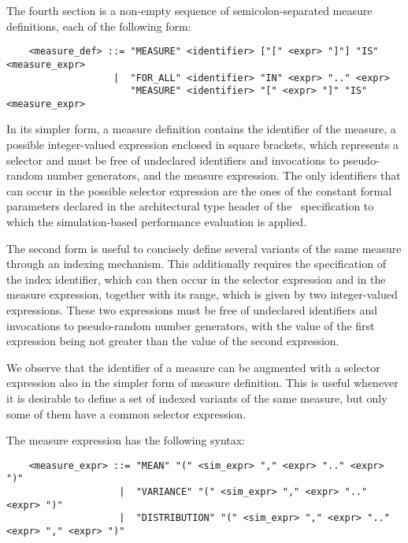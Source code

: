 The fourth section is a non-empty sequence of semicolon-separated measure definitions, each of the following
form:

        \begin{verbatim}
    <measure_def> ::= "MEASURE" <identifier> ["[" <expr> "]"] "IS" <measure_expr>
                   |  "FOR_ALL" <identifier> "IN" <expr> ".." <expr>
                      "MEASURE" <identifier> "[" <expr> "]" "IS" <measure_expr>
        \end{verbatim}

In its simpler form, a measure definition contains the identifier of the measure, a possible
integer-valued expression enclosed in square brackets, which represents a selector and must be free of
undeclared identifiers and invocations to pseudo-random number generators, and the measure expression. The
only identifiers that can occur in the possible selector expression are the ones of the constant formal
parameters declared in the architectural type header of the \aemilia\ specification to which the
simulation-based performance evaluation is applied.

The second form is useful to concisely define several variants of the same measure through an indexing
mechanism. This additionally requires the specification of the index identifier, which can then occur in the
selector expression and in the measure expression, together with its range, which is given by two
integer-valued expressions. These two expressions must be free of undeclared identifiers and invocations to
pseudo-random number generators, with the value of the first expression being not greater than the value of
the second expression.

We observe that the identifier of a measure can be augmented with a selector expression also in the simpler
form of measure definition. This is useful whenever it is desirable to define a set of indexed variants of
the same measure, but only some of them have a common selector expression.

The measure expression has the following syntax:

        \begin{verbatim}
    <measure_expr> ::= "MEAN" "(" <sim_expr> "," <expr> ".." <expr> ")"
                    |  "VARIANCE" "(" <sim_expr> "," <expr> ".." <expr> ")"
                    |  "DISTRIBUTION" "(" <sim_expr> "," <expr> ".." <expr> "," <expr> ")"
        \end{verbatim}

